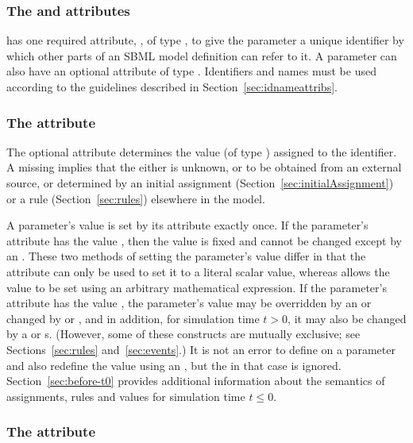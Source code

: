 \subsubsection{The  and  attributes}

\Parameter has one required attribute, , of type
, to give the parameter a unique identifier by which
other parts of an SBML model definition can refer to it.  A
parameter can also have an optional  attribute of type
.  Identifiers and names must be used according
to the guidelines described in Section~\ref{sec:idnameattribs}.


\subsubsection{The  attribute}
\label{sec:parameter-value}


The optional attribute  determines the value (of type
) assigned to the identifier.  A missing
 implies that the  either is unknown, or
to be obtained from an external source, or determined by an
initial assignment (Section~\ref{sec:initialAssignment}) or a rule
(Section~\ref{sec:rules}) elsewhere in the model.

A parameter's value is set by its  attribute exactly
once.  If the parameter's  attribute has the value
, then the value is fixed and cannot be
changed except by an \InitialAssignment.  These two methods of
setting the parameter's value differ in that the 
attribute can only be used to set it to a literal scalar value,
whereas \InitialAssignment allows the value to be set using an
arbitrary mathematical expression.  If the parameter's
 attribute has the value , the parameter's
value may be overridden by an \InitialAssignment or changed by
\AssignmentRule or \AlgebraicRule, and in addition, for simulation
time $t > 0$, it may also be changed by a \RateRule or \Event{}s.
(However, some of these constructs are mutually exclusive; see
Sections~\ref{sec:rules} and~\ref{sec:events}.)  It is not an
error to define  on a parameter and also redefine the
value using an \InitialAssignment, but the  in that
case is ignored.  Section~\ref{sec:before-t0} provides additional
information about the semantics of assignments, rules and values
for simulation time $t \leq 0$.


\subsubsection{The  attribute}
\label{sec:parameter-units}

